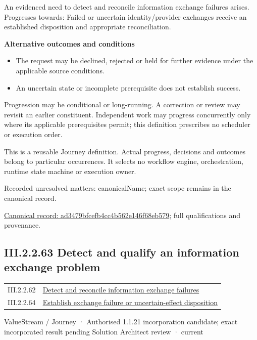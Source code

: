 An evidenced need to detect and reconcile information exchange failures arises. Progresses towards: Failed or uncertain identity/provider exchanges receive an established disposition and appropriate reconciliation.



\par\medskip\textbf{Alternative outcomes and conditions}\par


\begin{itemize}


\item The request may be declined, rejected or held for further evidence under the applicable source conditions.

\item An uncertain state or incomplete prerequisite does not establish success.

\end{itemize}


Progression may be conditional or long-running. A correction or review may revisit an earlier constituent. Independent work may progress concurrently only where its applicable prerequisites permit; this definition prescribes no scheduler or execution order.



This is a reusable Journey definition. Actual progress, decisions and outcomes belong to particular occurrences. It selects no workflow engine, orchestration, runtime state machine or execution owner.


{\small Recorded unresolved matters: canonicalName; exact scope remains in the canonical record.}\par
{\footnotesize \href{../../../../../../../continuum/strategy/value-stream/ad3479bfcefb4cc4b562e146f68eb579.md}{Canonical record: ad3479bfcefb4cc4b562e146f68eb579}; full qualifications and provenance.}\par
\subsection*{III.2.2.63 Detect and qualify an information exchange problem}
\label{navigation:III.2.2.63}

\begin{longtable}{p{.22\linewidth}p{.73\linewidth}}
III.2.2.62 & \hyperref[element:ad3479bfcefb4cc4b562e146f68eb579]{Detect and reconcile information exchange failures} \\
III.2.2.64 & \hyperref[element:f49ed7138ad1435a94cb1f509aaf0b8d]{Establish exchange failure or uncertain-effect disposition} \\
\end{longtable}
\label{element:0e171ae23faf436a90fe7a85889acd5c}
{\small ValueStream / Journey · Authorised 1.1.21 incorporation candidate; exact incorporated result pending Solution Architect review · current}\par


